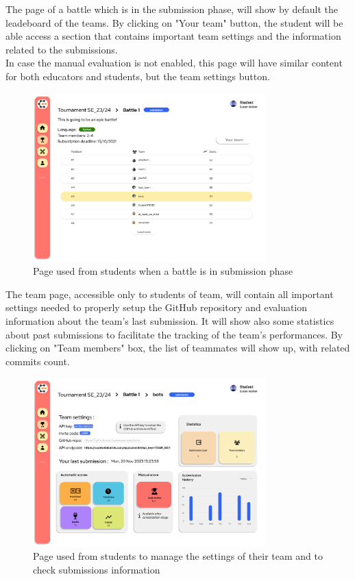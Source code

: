 The page of a battle which is in the submission phase, will show by default the leadeboard of the teams. By clicking on "Your team" button, the student will be able access a section that contains important team settings and the information related to the submissions.\\
In case the manual evaluation is not enabled, this page will have similar content for both educators and students, but the team settings button.\\
\begin{figure}[H]
    \centering
    \includegraphics[width=0.8\textwidth]{Mockups/14_student_battle_submission.png}
    \caption{Page used from students when a battle is in submission phase}
\end{figure}
The team page, accessible only to students of team, will contain all important settings needed to properly setup the GitHub repository and evaluation information about the team's last submission. It will show also some statistics about past submissions to facilitate the tracking of the team's performances.
By clicking on "Team members" box, the list of teammates will show up, with related commits count.\\
\begin{figure}[H]
    \centering
    \includegraphics[width=0.8\textwidth]{Mockups/15_student_team.png}
    \caption{Page used from students to manage the settings of their team and to check submissions information}
\end{figure}
    
